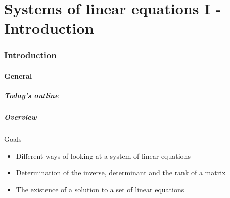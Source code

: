 \part{Systems of linear equations I - Introduction}
\section{Introduction}
\subsection*{General}
\begin{frame}[label=contentslin1]
  \frametitle{Today's outline}
\end{frame}

\begin{frame}
  \frametitle{Overview}
  \begin{block}{Goals}
    \begin{itemize}
      \item Different ways of looking at a system of linear equations
      \item Determination of the inverse, determinant and the rank of a matrix
      \item The existence of a solution to a set of linear equations
  \end{itemize}
  \end{block}
\end{frame}

% 
